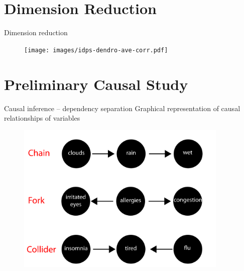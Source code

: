\documentclass[10pt]{beamer} %
\begin{document}
\section{Dimension Reduction}
\begin{frame}[plain]{Dimension reduction}
\begin{figure}
\texttt{[image: images/idps-dendro-ave-corr.pdf]}
\end{figure}

\end{frame}

\section{Preliminary Causal Study}

\begin{frame}[plain]{Causal inference -- dependency separation}
Graphical representation of causal relationships of variables
\begin{figure}
\includegraphics[width = 0.9\textwidth]{images/CIexample.png}
\end{figure}
\end{frame}
\end{document}
